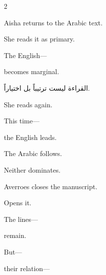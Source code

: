 \begin{paracol}{2}
\medskip

\switchcolumn*


\medskip

\switchcolumn

Aisha returns to the Arabic text.

\medskip

She reads it as primary.

\medskip

The English---

\medskip

becomes marginal.

\medskip

\switchcolumn*

\begin{AR}
القراءة ليست ترتيباً بل اختياراً.
\end{AR}

\medskip

\switchcolumn

She reads again.

\medskip

This time---

\medskip

the English leads.

\medskip

The Arabic follows.

\medskip

Neither dominates.

\medskip

\switchcolumn*


\medskip

\switchcolumn

Averroes closes the manuscript.

\medskip

Opens it.

\medskip

The lines---

\medskip

remain.

\medskip

But---

\medskip

their relation---

\medskip


\end{paracol}
